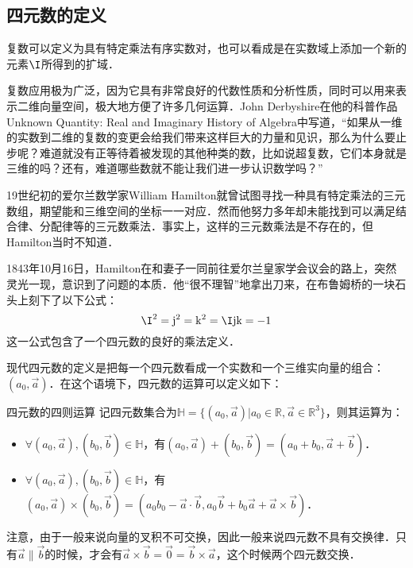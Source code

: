 

\subsection{四元数的定义}

复数可以定义为具有特定乘法有序实数对，也可以看成是在实数域上添加一个新的元素$  \I$所得到的扩域．

复数应用极为广泛，因为它具有非常良好的代数性质和分析性质，同时可以用来表示二维向量空间，极大地方便了许多几何运算．John Derbyshire在他的科普作品Unknown Quantity: Real and Imaginary History of Algebra中写道，“如果从一维的实数到二维的复数的变更会给我们带来这样巨大的力量和见识，那么为什么要止步呢？难道就没有正等待着被发现的其他种类的数，比如说超复数，它们本身就是三维的吗？还有，难道哪些数就不能让我们进一步认识数学吗？”

19世纪初的爱尔兰数学家William Hamilton就曾试图寻找一种具有特定乘法的三元数组，期望能和三维空间的坐标一一对应．然而他努力多年却未能找到可以满足结合律、分配律等的三元数乘法．事实上，这样的三元数乘法是不存在的，但Hamilton当时不知道．

1843年10月16日，Hamilton在和妻子一同前往爱尔兰皇家学会议会的路上，突然灵光一现，意识到了问题的本质．他“很不理智”地拿出刀来，在布鲁姆桥的一块石头上刻下了以下公式：$$\I^2=\mathrm{j}^2=\mathrm{k}^2=\I\mathrm{j}\mathrm{k}=-1$$这一公式包含了一个四元数的良好的乘法定义．

现代四元数的定义是把每一个四元数看成一个实数和一个三维实向量的组合：$(a_0, \vec{a})$．在这个语境下，四元数的运算可以定义如下：

\begin{definition}{四元数的四则运算}
记四元数集合为$\mathbb{H}=\{(a_0, \vec{a})|a_0\in\mathbb{R}, \vec{a}\in\mathbb{R}^3\}$，则其运算为：
\begin{itemize}
\item $\forall(a_0, \vec{a}), (b_0, \vec{b})\in\mathbb{H}$，有$(a_0, \vec{a})+ (b_0, \vec{b})=(a_0+b_0, \vec{a}+\vec{b})$．
\item $\forall(a_0, \vec{a}), (b_0, \vec{b})\in\mathbb{H}$，有$(a_0, \vec{a})\times (b_0, \vec{b})=(a_0b_0-\vec{a}\cdot\vec{b}, a_0\vec{b}+b_0\vec{a}+\vec{a}\times\vec{b})$．

\end{itemize}

\end{definition}

注意，由于一般来说向量的叉积不可交换，因此一般来说四元数不具有交换律．只有$\vec{a}\parallel\vec{b}$的时候，才会有$\vec{a}\times\vec{b}=\vec{0}=\vec{b}\times\vec{a}$，这个时候两个四元数交换．

